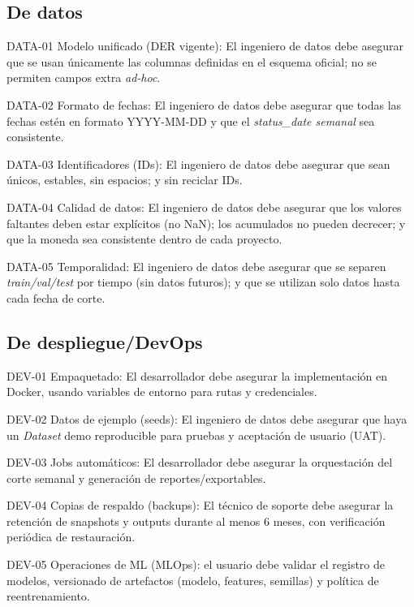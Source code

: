 \documentclass[12pt]
{charter}
\begin{document}
\subsection{De datos}
\begin{description}
  \item DATA-01 Modelo unificado (DER vigente): El ingeniero de datos debe asegurar que se usan únicamente las columnas definidas en el esquema oficial; no se permiten campos extra \textit{ad-hoc}.

  \item DATA-02 Formato de fechas: El ingeniero de datos debe asegurar que todas las fechas estén en formato YYYY-MM-DD y que el \textit{status\_date semanal} sea consistente.

  \item DATA-03 Identificadores (IDs): El ingeniero de datos debe asegurar que sean únicos, estables, sin espacios; y sin reciclar IDs.

  \item DATA-04 Calidad de datos: El ingeniero de datos debe asegurar que los valores faltantes deben estar explícitos (no NaN); los acumulados no pueden decrecer; y que la moneda sea consistente dentro de cada proyecto.

  \item DATA-05 Temporalidad: El ingeniero de datos debe asegurar que se separen  \textit{train/val/test} por tiempo (sin datos futuros); y que se utilizan solo datos hasta cada fecha de corte.

\end{description}

\subsection{De despliegue/DevOps}
\begin{description}
  \item DEV-01 Empaquetado: El desarrollador debe asegurar la implementación en Docker, usando variables de entorno para rutas y credenciales.

  \item DEV-02 Datos de ejemplo (seeds): El ingeniero de datos debe asegurar que haya un \textit{Dataset} demo reproducible para pruebas y aceptación de usuario (UAT).
  
  \item DEV-03 Jobs automáticos: El desarrollador debe asegurar la orquestación del corte semanal y generación de reportes/exportables.
  
  \item DEV-04 Copias de respaldo (backups): El técnico de soporte debe asegurar la retención de snapshots y outputs durante al menos 6 meses, con verificación periódica de restauración.
  
  \item DEV-05 Operaciones de ML (MLOps): el usuario debe validar el registro de modelos, versionado de artefactos (modelo, features, semillas) y política de reentrenamiento.

\end{description}
\end{document}
